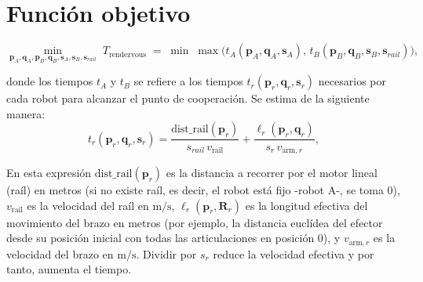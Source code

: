 \section*{Función objetivo}
\begin{equation}
\min_{\mathbf{p}_A,\mathbf{q}_A,\mathbf{p}_B,\mathbf{q}_B,\mathbf{s}_A,\mathbf{s}_B,\mathbf{s}_{rail}}\; 
T_{\text{rendezvous}} \;=\; \min\; \max\big(t_A(\mathbf{p}_A,\mathbf{q}_A,\mathbf{s}_A),\,t_B(\mathbf{p}_B,\mathbf{q}_B,\mathbf{s}_B,\mathbf{s}_{rail})\big),
\label{eq:fo-mono}
\end{equation}

donde los tiempos $t_A$ y $t_B$ se refiere a los tiempos $t_{r}(\mathbf{p}_r,\mathbf{q}_r,\mathbf{s}_r)$
necesarios por cada robot para alcanzar
el punto de cooperación. Se estima de la siguiente manera:
\[
t_{r}(\mathbf{p}_r,\mathbf{q}_r,\mathbf{s}_r)
=\frac{\text{dist\_rail}(\mathbf{p}_r)}{s_{rail}\,v_{\text{rail}}}
+\frac{\ell_r(\mathbf{p}_r,\mathbf{q}_r)}{s_r\,v_{\text{arm},r}},
\]


En esta expresión \(\mathrm{dist\_rail}(\mathbf{p}_r)\) es la distancia a recorrer 
por el motor lineal (raíl) en metros (si no existe raíl, es decir, el robot 
está fijo -robot A-, se toma \(0\)),
\(v_{\text{rail}}\) es la velocidad del raíl en \(\mathrm{m/s}\), 
\(\ell_r(\mathbf{p}_r,\mathbf{R}_r)\) es la longitud
efectiva del movimiento del brazo en metros (por ejemplo, la distancia euclídea del efector
desde su posición inicial con todas las articulaciones en posición $0$), y \(v_{\text{arm},r}\) es la 
velocidad del brazo en \(\mathrm{m/s}\). Dividir por \(s_r\)
reduce la velocidad efectiva y por tanto, aumenta el tiempo. \\

